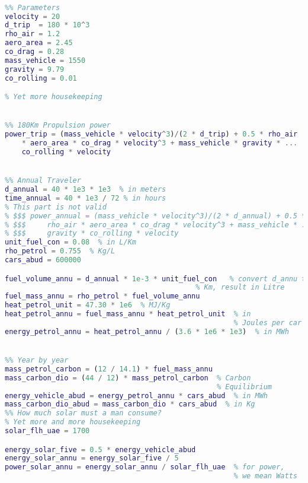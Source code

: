 \documentclass[12pt]{article}
\begin{document}
\begin{lstlisting}[language=Matlab]

%% Parameters
velocity = 20
d_trip  = 180 * 10^3
rho_air = 1.2
aero_area = 2.45
co_drag = 0.28
mass_vehicle = 1550
gravity = 9.79
co_rolling = 0.01

% Yet more housekeeping


%% 180Km Propulsion power
power_trip = (mass_vehicle * velocity^3)/(2 * d_trip) + 0.5 * rho_air ...
    * aero_area * co_drag * velocity^3 + mass_vehicle * gravity * ...
    co_rolling * velocity


%% Annual Traveler
d_annual = 40 * 1e3 * 1e3  % in meters
time_annual = 40 * 1e3 / 72 % in hours
% This part is not valid
% $$$ power_annual = (mass_vehicle * velocity^3)/(2 * d_annual) + 0.5 * ...
% $$$     rho_air * aero_area * co_drag * velocity^3 + mass_vehicle * ...
% $$$     gravity * co_rolling * velocity
unit_fuel_con = 0.08  % in L/Km
rho_petrol = 0.755  % Kg/L
cars_abud = 600000

fuel_volume_annu = d_annual * 1e-3 * unit_fuel_con   % convert d_annu to
                                             % Km, result in Litre
fuel_mass_annu = rho_petrol * fuel_volume_annu
heat_petrol_unit = 47.30 * 1e6  % MJ/Kg
heat_petrol_annu = fuel_mass_annu * heat_petrol_unit  % in
                                                      % Joules per car
energy_petrol_annu = heat_petrol_annu / (3.6 * 1e6 * 1e3)  % in MWh


%% Year by year
mass_petrol_carbon = (12 / 14.1) * fuel_mass_annu
mass_carbon_dio = (44 / 12) * mass_petrol_carbon  % Carbon
                                                  % Equilibrium
energy_vehicle_abud = energy_petrol_annu * cars_abud  % in MWh
mass_carbon_dio_abud = mass_carbon_dio * cars_abud  % in Kg
%% How much solar must a man consume?
% Yet more and more housekeeping
solar_flh_uae = 1700

energy_solar_five = 0.5 * energy_vehicle_abud
energy_solar_annu = energy_solar_five / 5
power_solar_annu = energy_solar_annu / solar_flh_uae  % for power,
                                                      % we mean Watts




\end{lstlisting}
\end{document}
